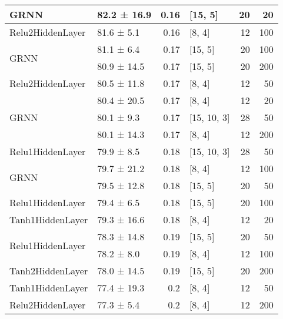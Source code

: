 \begin{table*}[h]
\begin{tabular}{llrlrr}
 \hline
GRNN                                & 82.2 ± 16.9 &  0.16 & [15, 5]        &         20 &       20 \\
 \hline
Relu2HiddenLayer                    & 81.6 ± 5.1  &  0.16 & [8, 4]         &         12 &      100 \\
 \hline
\multirow{2}{*}{GRNN}               & 81.1 ± 6.4  &  0.17 & [15, 5]        &         20 &      100 \\
                                            & 80.9 ± 14.5 &  0.17 & [15, 5]        &         20 &      200 \\
 \hline
Relu2HiddenLayer                    & 80.5 ± 11.8 &  0.17 & [8, 4]         &         12 &       50 \\
 \hline
\multirow{3}{*}{GRNN}               & 80.4 ± 20.5 &  0.17 & [8, 4]         &         12 &       20 \\
                                            & 80.1 ± 9.3  &  0.17 & [15, 10, 3]    &         28 &       50 \\
                                            & 80.1 ± 14.3 &  0.17 & [8, 4]         &         12 &      200 \\
 \hline
Relu1HiddenLayer                    & 79.9 ± 8.5  &  0.18 & [15, 10, 3]    &         28 &       50 \\
 \hline
\multirow{2}{*}{GRNN}               & 79.7 ± 21.2 &  0.18 & [8, 4]         &         12 &      100 \\
                                            & 79.5 ± 12.8 &  0.18 & [15, 5]        &         20 &       50 \\
 \hline
Relu1HiddenLayer                    & 79.4 ± 6.5  &  0.18 & [15, 5]        &         20 &      100 \\
 \hline
Tanh1HiddenLayer                    & 79.3 ± 16.6 &  0.18 & [8, 4]         &         12 &       20 \\
 \hline
\multirow{2}{*}{Relu1HiddenLayer}   & 78.3 ± 14.8 &  0.19 & [15, 5]        &         20 &       50 \\
                                            & 78.2 ± 8.0  &  0.19 & [8, 4]         &         12 &      100 \\
 \hline
Tanh2HiddenLayer                    & 78.0 ± 14.5 &  0.19 & [15, 5]        &         20 &      200 \\
 \hline
Tanh1HiddenLayer                    & 77.4 ± 19.3 &  0.2  & [8, 4]         &         12 &       50 \\
 \hline
Relu2HiddenLayer                    & 77.3 ± 5.4  &  0.2  & [8, 4]         &         12 &      200 \\

\end{tabular}
\end{table*}
